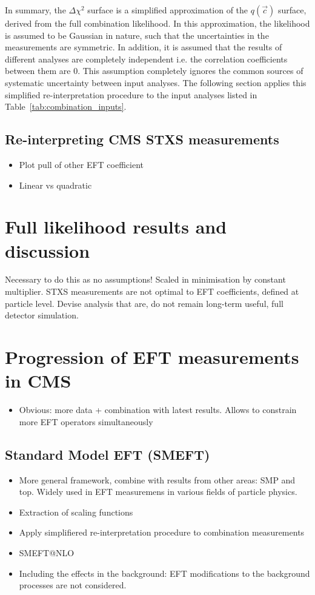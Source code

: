 In summary, the $\Delta\chi^2$ surface is a simplified approximation of the $q(\vec{c})$ surface, derived from the full combination likelihood. In this approximation, the likelihood is assumed to be Gaussian in nature, such that the uncertainties in the measurements are symmetric. In addition, it is assumed that the results of different analyses are completely independent i.e. the correlation coefficients between them are 0. This assumption completely ignores the common sources of systematic uncertainty between input analyses. The following section applies this simplified re-interpretation procedure to the input analyses listed in Table~\ref{tab:combination_inputs}.

\subsection{Re-interpreting CMS STXS measurements}

\begin{itemize}
    \item Plot pull of other EFT coefficient
    \item Linear vs quadratic
\end{itemize}

\section{Full likelihood results and discussion}\label{sec:eft_results}
Necessary to do this as no assumptions!
Scaled in minimisation by constant multiplier. STXS measurements are not optimal to EFT coefficients, defined at particle level. Devise analysis that are, do not remain long-term useful, full detector simulation.


\section{Progression of EFT measurements in CMS}\label{sec:eft_improving}
\begin{itemize}
    \item Obvious: more data + combination with latest results. Allows to constrain more EFT operators simultaneously
\end{itemize}

\subsection{Standard Model EFT (SMEFT)}
\begin{itemize}
    \item More general framework, combine with results from other areas: SMP and top. Widely used in EFT measuremens in various fields of particle physics.
    \item Extraction of scaling functions
    \item Apply simplifiered re-interpretation procedure to combination measurements
    \item SMEFT@NLO
    \item Including the effects in the background: EFT modifications to the background processes are not considered. 
\end{itemize}

